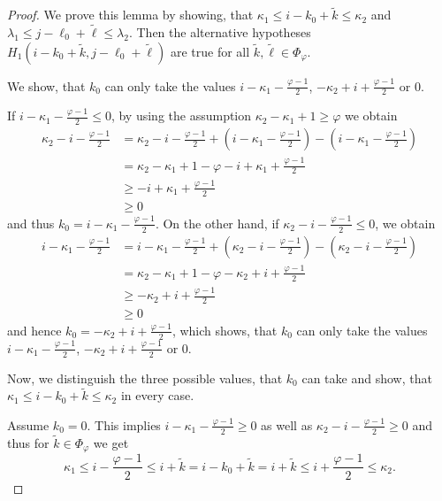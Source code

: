 \documentclass[a4paper,12pt]{article}
\theoremstyle{plain}
\theoremstyle{definition}
\numberwithin{equation}{section}
\begin{document}
\begin{appendix}
\begin{proof}
		We prove this lemma by showing, that $\kappa_1 \leq i - k_0 + \tilde{k} \leq \kappa_2$ and $\lambda_1 \leq j - \ell_0 + \tilde{\ell} \leq \lambda_2$. Then the alternative hypotheses $H_1(i - k_0 + \tilde{k}, j - \ell_0 + \tilde{\ell})$ are true for all $\tilde{k}, \tilde{\ell} \in \Phi_\varphi$.
		
		We show, that $k_0$ can only take the values $i - \kappa_1 - \frac{\varphi - 1}{2}$, $- \kappa_2 + i + \frac{\varphi - 1}{2}$ or $0$. 
		
		If $i - \kappa_1 - \frac{\varphi - 1}{2} \leq 0$, by using the assumption $\kappa_2 - \kappa_1 + 1 \geq \varphi$ we obtain
		\begin{align*}
			\kappa_2 - i - \frac{\varphi - 1}{2} &= \kappa_2 - i - \frac{\varphi - 1}{2} + \left( i - \kappa_1 - \frac{\varphi - 1}{2} \right) - \left( i - \kappa_1 - \frac{\varphi - 1}{2} \right) \\
			&= \kappa_2 - \kappa_1 + 1 - \varphi - i + \kappa_1 + \frac{\varphi - 1}{2} \\
			&\geq - i + \kappa_1 + \frac{\varphi - 1}{2} \\
			&\geq 0
		\end{align*}
		and thus $k_0 = i - \kappa_1 - \frac{\varphi - 1}{2}$. On the other hand, if $\kappa_2 - i - \frac{\varphi - 1}{2} \leq 0$, we obtain
		\begin{align*}
			i - \kappa_1 - \frac{\varphi - 1}{2} &= i - \kappa_1 - \frac{\varphi - 1}{2} + \left( \kappa_2 - i - \frac{\varphi - 1}{2} \right) - \left( \kappa_2 - i - \frac{\varphi - 1}{2} \right) \\
			&= \kappa_2 - \kappa_1 + 1 - \varphi - \kappa_2 + i + \frac{\varphi - 1}{2} \\
			&\geq - \kappa_2 + i + \frac{\varphi - 1}{2} \\
			&\geq 0
		\end{align*}
		and hence $k_0 = - \kappa_2 + i + \frac{\varphi - 1}{2}$, which shows, that $k_0$ can only take the values $i - \kappa_1 - \frac{\varphi - 1}{2}$, $- \kappa_2 + i + \frac{\varphi - 1}{2}$ or $0$.
		
		Now, we distinguish the three possible values, that $k_0$ can take and show, that $\kappa_1 \leq i - k_0 + \tilde{k} \leq \kappa_2$ in every case.
		
		Assume $k_0 = 0$. This implies $i - \kappa_1 - \frac{\varphi - 1}{2} \geq 0$ as well as $\kappa_2 - i - \frac{\varphi - 1}{2} \geq 0$ and thus for $\tilde{k} \in \Phi_\varphi$ we get
		\begin{equation*}
			\kappa_1 \leq i - \frac{\varphi - 1}{2} \leq i + \tilde{k} = i - k_0 + \tilde{k} = i + \tilde{k} \leq i + \frac{\varphi - 1}{2} \leq \kappa_2.
		\end{equation*}
		

\end{proof}
\end{appendix}
\end{document}
